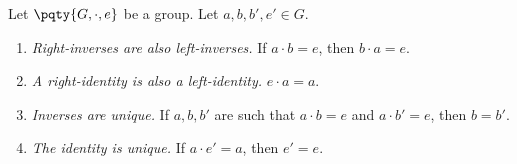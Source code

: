 \begin{proposition}
    \label{prop:inverse-identity}%
    Let \(\pqty{G, \cdot, e}\) be a group. Let \(a, b, b', e' \in G\).

    \begin{enumerate}
        \item \emph{Right-inverses are also left-inverses.} If \(a \cdot b = e\), then \(b \cdot a = e\).
        \item \emph{A right-identity is also a left-identity.} \(e \cdot a = a\).
        \item \emph{Inverses are unique.} If \(a, b, b'\) are such that \(a \cdot b = e\) and \(a \cdot b' = e\), then \(b = b'\).
        \item \emph{The identity is unique.} If \(a \cdot e' = a\), then \(e' = e\).
    \end{enumerate}
\end{proposition}

